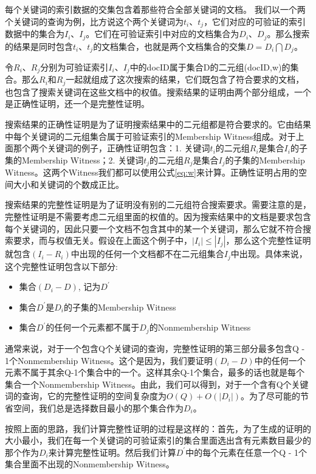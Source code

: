 每个关键词的索引数据的交集包含着那些符合全部关键词的文档。
我们以一个两个关键词的查询为例，比方说这个两个关键词为$t_i$、$t_j$，它们对应的可验证的索引数据中的集合为$I_i$、$I_j$。它们在可验证索引中对应的文档集合为$D_i$、$D_j$。那么搜索的结果是同时包含$t_i$、$t_j$的文档集合，也就是两个文档集合的交集$D = D_i \bigcap D_j$。

令$R_i$、$R_j$分别为可验证索引$I_i$、$I_j$中的docID属于集合D的二元组(docID,w)的集合。那么$R_i$和$R_j$一起就组成了这次搜索的结果，它们既包含了符合要求的文档，也包含了搜索关键词在这些文档中的权值。搜索结果的证明由两个部分组成，一个是正确性证明，还一个是完整性证明。

搜索结果的正确性证明是为了证明搜索结果中的二元组都是符合要求的。它由结果中每个关键词的二元组集合属于可验证索引的Membership Witness组成。对于上面那个两个关键词的例子，正确性证明包含：1. 关键词$t_i$的二元组$R_i$是集合$I_i$的子集的Membership Witness；2. 关键词$t_j$的二元组$R_j$是集合$I_j$的子集的Membership Witness。这两个Witness我们都可以使用公式\ref{eq:w}来计算。正确性证明占用的空间大小和关键词的个数成正比。

搜索结果的完整性证明是为了证明没有别的二元组符合搜索要求。需要注意的是，完整性证明是不需要考虑二元组里面的权值的。因为搜索结果中的文档是要求包含每个关键词的，因此只要一个文档不包含其中的某一个关键词，那么它就不符合搜索要求，而与权值无关。假设在上面这个例子中，$|I_i| \le |I_j|$，那么这个完整性证明就包含$(I_i - R_i)$中出现的任何一个文档都不在二元组集合$I_j$中出现。具体来说，这个完整性证明包含以下部分:
\begin{itemize}
\item 集合$(D_i - D)$, 记为$D^\prime$
\item 集合$D^\prime$是$D_i$的子集的Membership Witness
\item 集合$D^\prime$的任何一个元素都不属于$D_j$的Nonmembership Witness
\end{itemize}

通常来说，对于一个包含Q个关键词的查询，完整性证明的第三部分最多包含Q - 1个Nonmembership Witness。这个是因为，我们要证明$(D_i - D)$中的任何一个元素不属于其余Q-1个集合中的一个。这样其余Q-1个集合，最多的话也就是每个集合一个Nonmembership Witness。由此，我们可以得到，对于一个含有Q个关键词的查询，它的完整性证明的空间复杂度为$O(Q) + O(|D_i|)$。为了尽可能的节省空间，我们总是选择数目最小的那个集合作为$D_i$。

按照上面的思路，我们计算完整性证明的过程是这样的：首先，为了生成的证明的大小最小，我们在每一个关键词的可验证索引的集合里面选出含有元素数目最少的那个作为$D_i$来计算完整性证明。然后我们计算$D^\prime$中的每个元素在任意一个Q - 1个集合里面不出现的Nonmembership Witness。

